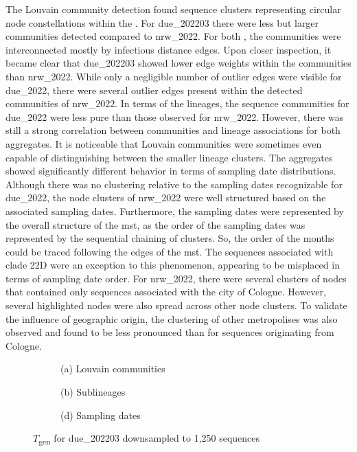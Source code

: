 The Louvain community detection found sequence clusters representing circular node constellations within the . For due\_202203 there were less but larger communities detected compared to nrw\_2022. For both , the communities were interconnected mostly by infectious distance edges. Upon closer inspection, it became clear that due\_202203 showed lower edge weights within the communities than nrw\_2022. While only a negligible number of outlier edges were visible for due\_2022, there were several outlier edges present within the detected communities of nrw\_2022. In terms of the lineages, the sequence communities for due\_2022 were less pure than those observed for nrw\_2022. However, there was still a strong correlation between communities and lineage associations for both aggregates. It is noticeable that Louvain communities were sometimes even capable of distinguishing between the smaller lineage clusters. The aggregates showed significantly different behavior in terms of sampling date distributions. Although there was no clustering relative to the sampling dates recognizable for due\_2022, the node clusters of nrw\_2022 were well structured based on the associated sampling dates. Furthermore, the sampling dates were represented by the overall structure of the \acrshort{mst}, as the order of the sampling dates was represented by the sequential chaining of clusters. So, the order of the months could be traced following the edges of the \acrshort{mst}. The sequences associated with clade 22D were an exception to this phenomenon, appearing to be misplaced in terms of sampling date order. For nrw\_2022, there were several clusters of nodes that contained only sequences associated with the city of Cologne. However, several highlighted nodes were also spread across other node clusters. To validate the influence of geographic origin, the clustering of other metropolises was also observed and found to be less pronounced than for sequences originating from Cologne.

\begin{figure}[H]
    \begin{subfigure}[b]{0.32\textwidth}
    
    \caption*{(a) Louvain communities}
  \end{subfigure}
    \begin{subfigure}[b]{0.32\textwidth}
    
    \caption*{(b) Sublineages}
  \end{subfigure}
    \begin{subfigure}[b]{0.32\textwidth}
    
    \caption*{(d) Sampling dates}
  \end{subfigure}
  \caption[$T$\textsubscript{gen} for due\_202203 downsampled to 1,250 sequences]{$T$\textsubscript{gen} for due\_202203 downsampled to 1,250 sequences}
  \label{fig:msts_due_2022}
\end{figure}

